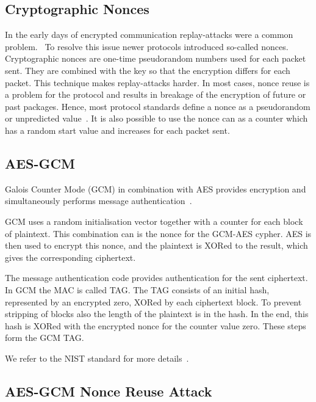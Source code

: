 
\subsection{Cryptographic Nonces}

In the early days of encrypted communication replay-attacks were a common
problem.~ To resolve this issue newer
protocols introduced so-called nonces. Cryptographic nonces are one-time
pseudorandom numbers used for each packet sent. They are combined with the key
so that the encryption differs for each packet. This technique makes
replay-attacks harder. In most cases, nonce reuse is a problem for the protocol
and results in breakage of the encryption of future or past packages. Hence,
most protocol standards define a nonce as a pseudorandom or unpredicted
value~\cite{noncegeneral}. It is also possible to use the nonce can as a counter
which has a random start value and increases for each packet sent.

\subsection{AES-GCM}

Galois Counter Mode (GCM) in combination with AES provides encryption and
simultaneously performs message authentication~\cite{gcm, gcmnist}.

GCM uses a random initialisation vector together with a counter for each block
of plaintext. This combination can is the nonce for the GCM-AES cypher. AES is
then used to encrypt this nonce, and the plaintext is XORed to the result, which
gives the corresponding ciphertext.

The message authentication code provides authentication for the sent ciphertext.
In GCM the MAC is called TAG. The TAG consists of an initial hash, represented
by an encrypted zero, XORed by each ciphertext block. To prevent stripping of
blocks also the length of the plaintext is in the hash. In the end, this hash is
XORed with the encrypted nonce for the counter value zero. These steps form the
GCM TAG.


We refer to the NIST standard for more details~\cite{gcmnist}.

\subsection{AES-GCM Nonce Reuse Attack}

